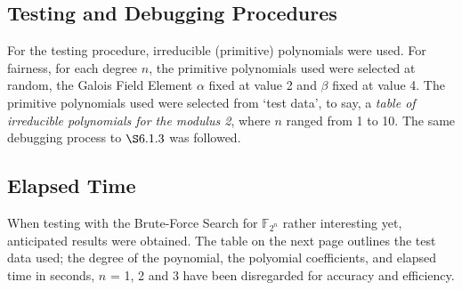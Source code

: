 \documentclass[iwp,first]{luthesis}
\begin{document}
\subsection{Testing and Debugging Procedures}

For the testing procedure, irreducible (primitive) polynomials were used. For fairness, for each degree $n$, the primitive polynomials used were selected at random, the Galois Field Element $\alpha$ fixed at value 2 and $\beta$ fixed at value 4. The primitive polynomials used were selected from `test data', to say, a \textit{table of irreducible polynomials for the modulus 2}, where $n$ ranged from 1 to 10. The same debugging process to $\S6.1.3$ was followed. 




\subsection{Elapsed Time}

When testing with the Brute-Force Search for $\mathbb{F}_{2^n}$ rather interesting yet, anticipated results were obtained. The table on the next page outlines the test data used; the degree of the poynomial, the polyomial coefficients, and elapsed time in seconds, $n$ = 1, 2 and 3 have been disregarded for accuracy and efficiency. 

\newpage
\end{document}

